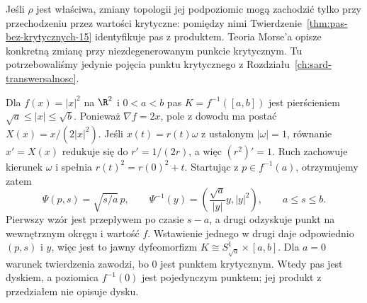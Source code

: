 \begin{uwaga}
Jeśli $\rho$ jest właściwa,
zmiany topologii jej podpoziomic
mogą zachodzić tylko przy
przechodzeniu przez wartości
krytyczne: pomiędzy nimi
Twierdzenie~\ref{thm:pas-bez-krytycznych-15}
identyfikuje pas z produktem.
Teoria Morse'a opisze
konkretną zmianę przy
niezdegenerowanym punkcie
krytycznym. Tu potrzebowaliśmy
jedynie pojęcia punktu
krytycznego z Rozdziału~\ref{ch:sard-transwersalnosc}.
\end{uwaga}

\par\smallskip
\begin{przyklad}
\label{prz:pas-pierscien-20}
Dla $f(x)=|x|^2$ na $\R^2$ i $0<a<b$ pas
$K=f^{-1}([a,b])$ jest pierścieniem
$\sqrt a\leq|x|\leq\sqrt b$.
Ponieważ $\nabla f=2x$, pole z dowodu ma postać
$X(x)=x/(2|x|^2)$.
Jeśli $x(t)=r(t)\omega$ z ustalonym $|\omega|=1$,
równanie $x'=X(x)$ redukuje się do
$r'=1/(2r)$, a więc $(r^2)'=1$.
Ruch zachowuje kierunek $\omega$ i spełnia
$r(t)^2=r(0)^2+t$.
Startując z $p\in f^{-1}(a)$, otrzymujemy zatem
\[
 \Psi(p,s)=\sqrt{s/a}\,p,\qquad
 \Psi^{-1}(y)=\left(\frac{\sqrt a}{|y|}y,|y|^2\right),
 \qquad a\leq s\leq b.
\]
Pierwszy wzór jest przepływem po czasie $s-a$,
a drugi odzyskuje punkt na wewnętrznym okręgu i wartość $f$.
Wstawienie jednego w drugi daje odpowiednio $(p,s)$ i $y$,
więc jest to jawny dyfeomorfizm
$K\cong S^1_{\sqrt a}\times[a,b]$.
Dla $a=0$ warunek twierdzenia zawodzi, bo $0$ jest punktem
krytycznym. Wtedy pas jest dyskiem, a poziomica $f^{-1}(0)$
jest pojedynczym punktem; jej produkt z przedziałem nie opisuje dysku.
\end{przyklad}

